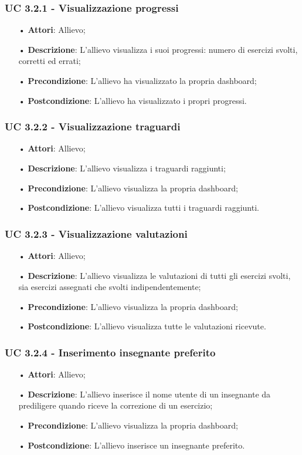 \subsubsection{UC 3.2.1 - Visualizzazione progressi}
\begin{itemize}
\item[•]\textbf{Attori}: Allievo;
\item[•]\textbf{Descrizione}: L'allievo visualizza i suoi progressi: numero di esercizi svolti, corretti ed errati;
\item[•]\textbf{Precondizione}: L'allievo ha visualizzato la propria dashboard;
\item[•]\textbf{Postcondizione}: L'allievo ha visualizzato i propri progressi.
\end{itemize}

\subsubsection{UC 3.2.2 - Visualizzazione traguardi}
\begin{itemize}
\item[•]\textbf{Attori}: Allievo;
\item[•]\textbf{Descrizione}: L'allievo visualizza i traguardi raggiunti;
\item[•]\textbf{Precondizione}: L'allievo visualizza la propria dashboard;
\item[•]\textbf{Postcondizione}: L'allievo visualizza tutti i traguardi raggiunti.
\end{itemize}

\subsubsection{UC 3.2.3 - Visualizzazione valutazioni}
\begin{itemize}
\item[•]\textbf{Attori}: Allievo;
\item[•]\textbf{Descrizione}: L'allievo visualizza le valutazioni di tutti gli esercizi svolti, sia esercizi assegnati che svolti indipendentemente;
\item[•]\textbf{Precondizione}: L'allievo visualizza la propria dashboard;
\item[•]\textbf{Postcondizione}: L'allievo visualizza tutte le valutazioni ricevute.
\end{itemize}

\subsubsection{UC 3.2.4 - Inserimento insegnante preferito}
\begin{itemize}
\item[•]\textbf{Attori}: Allievo;
\item[•]\textbf{Descrizione}: L'allievo inserisce il nome utente di un insegnante da prediligere quando riceve la correzione di un esercizio;
\item[•]\textbf{Precondizione}: L'allievo visualizza la propria dashboard;
\item[•]\textbf{Postcondizione}: L'allievo inserisce un insegnante preferito.
\end{itemize}

